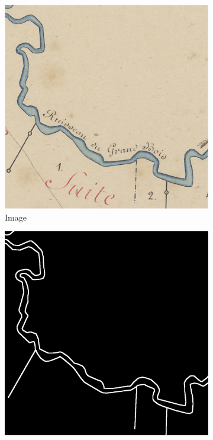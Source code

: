\documentclass[12pt]{article}
\begin{document}
\begin{figure}[H]
\begin{subfigure}[b]{.28\textwidth}
		\begin{minipage}[t]{1\linewidth}
			\centering
			\includegraphics[width=1\linewidth]{images/patches/img10.png}
			\caption{Image}
		\end{minipage}
	\end{subfigure}
	\begin{subfigure}[b]{.28\textwidth}
		\begin{minipage}[t]{1\linewidth}
			\centering
			\includegraphics[width=1\linewidth]{images/patches/gt10.png}

\end{minipage}
\end{subfigure}
\end{figure}
\end{document}
